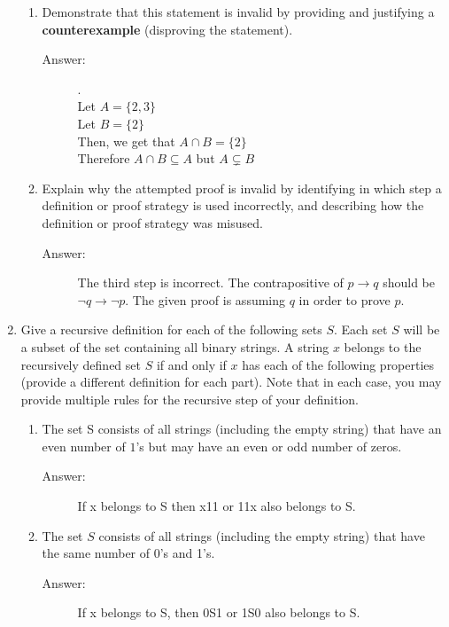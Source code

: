 \documentclass[12pt, oneside]{article}
\begin{document}
\begin{enumerate}
\begin{enumerate}
    \item Demonstrate that this statement is invalid by providing and justifying a {\bf counterexample} (disproving the statement).
    \begin{description}
        \item[Answer:] .\\
            Let $A = \{2,3\}$\\
            Let $B=\{2\}$\\
            Then, we get that $A \cap B = \{2\}$\\
            Therefore $A \cap B \subseteq A$ but $A \subsetneq B$
    \end{description}
    \item  Explain why the attempted proof is invalid by identifying in which step a definition or proof strategy is used incorrectly, and describing how the definition or proof strategy was misused.
    \begin{description}
        \item[Answer:] The third step is incorrect. The contrapositive of $p \rightarrow q$ should be $\lnot q \rightarrow \lnot p$. The given proof is assuming $q$ in order to prove $p$.
    \end{description}
\end{enumerate}


\item Give a recursive definition for each of the following sets $S$. Each set $S$ will be a subset of the set containing all binary strings. A string $x$ belongs to the recursively defined set $S$ if and only if $x$ has each of the following properties (provide a different definition for each part). Note that in each case, you may provide multiple rules for the recursive step of your definition.


\begin{enumerate}
    \item The set S consists of all strings (including the empty string) that have an even number of $1$'s but may have an even or odd number of zeros.
    \begin{description}
        \item[Answer:] If x belongs to S then x11 or 11x also belongs to S.
    \end{description}
    \item The set $S$ consists of all strings (including the empty string) that have the same number of 0's and 1's.
    \begin{description}
        \item[Answer:] If x belongs to S, then 0S1 or 1S0 also belongs to S.
    \end{description}
\end{enumerate}


\end{enumerate}
\end{document}
